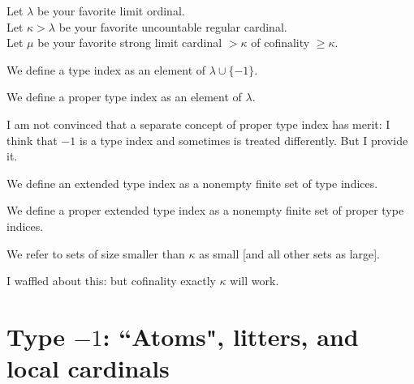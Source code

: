 \begin{definition}
\label {def:params}
\leanok
{}
Let $\lambda$ be your favorite limit ordinal. \\
Let $\kappa>\lambda$ be your favorite uncountable regular cardinal. \\
Let $\mu$ be your favorite strong limit cardinal $>\kappa$ of cofinality $\geq \kappa$.
\end{definition}

\begin{definition}
\label {def:type-index}
We define a type index as an element of $\lambda \cup \{-1\}$.
\end{definition}

\begin{definition}
\label {def:proper-type-index}
We define a proper type index as an element of $\lambda$.

I am not convinced that a separate concept of proper type index has merit:  I think that $-1$ is a type index and
sometimes is treated differently.  But I provide it.
\end{definition}

\begin{definition}
\label {def:extended-type-index}
We define an extended type index as a nonempty finite set of type indices.
\end{definition}

\begin{definition}
\label {def:proper-extended-type-index}
We define a proper extended type index as a nonempty finite set of proper type indices.

\end{definition}

\begin{definition}
\label {def:small}
\leanok
{}
We refer to sets of size smaller than $\kappa$ as small [and all other sets as large].
\end{definition}

I waffled about this:  but cofinality exactly $\kappa$ will work.

\section{Type $-1$:  ``Atoms", litters, and local cardinals}

